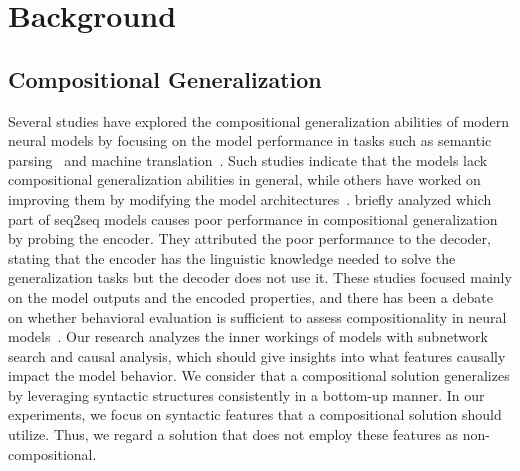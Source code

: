 \section{Background}
\label{sec:background}

\subsection{Compositional Generalization}
\label{subsec:compositional-generalization}
Several studies have explored the compositional generalization abilities of modern neural models by focusing on the model performance in tasks such as semantic parsing~\cite{kim-linzen-2020-cogs, csordas-etal-2021-devil, yao-koller-2022-structural,kim2022uncontrolledlexicalexposureleads, li-etal-2023-slog} and machine translation~\cite{li-etal-2021-compositional, dankers-etal-2022-paradox, kumon-etal-2024-evaluating}.
Such studies indicate that the models lack compositional generalization abilities in general, while others have worked on improving them by modifying the model architectures~\cite{bergan2021edge,ontanon-etal-2022-making}.
\citet{yao-koller-2022-structural} briefly analyzed which part of seq2seq models causes poor performance in compositional generalization by probing the encoder.
They attributed the poor performance to the decoder, stating that the encoder has the linguistic knowledge needed to solve the generalization tasks but the decoder does not use it.
These studies focused mainly on the model outputs and the encoded properties, and there has been a debate on whether behavioral evaluation is sufficient to assess compositionality in neural models~\citep{mccurdy-etal-2024-toward}.
Our research analyzes the inner workings of models with subnetwork search and causal analysis, which should give insights into what features causally impact the model behavior.
We consider that a compositional solution generalizes by leveraging syntactic structures consistently in a bottom-up manner.
In our experiments, we focus on syntactic features that a compositional solution should utilize.
Thus, we regard a solution that does not employ these features as non-compositional.


